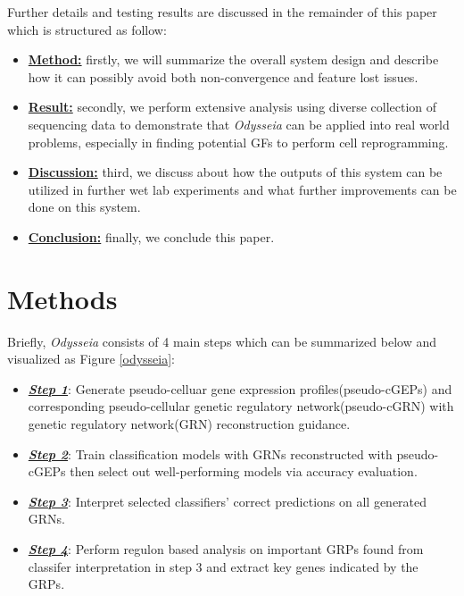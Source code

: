 \documentclass[fleqn,10pt]{wlscirep}
\begin{document}
Further details and testing results are discussed in the remainder of this paper which is structured as follow:
\begin{itemize}
\setlength\itemsep{0em}
\item{\hyperref[method]{\textbf{Method:}}}
    firstly, we will summarize the overall system design and describe how it can possibly avoid both non-convergence and feature lost issues.
\item {\hyperref[res]{\textbf{Result:}}}
    secondly, we perform extensive analysis using diverse collection of sequencing data to demonstrate that \emph{Odysseia} can be applied into real world problems, especially in finding potential GFs to perform cell reprogramming.
\item {\hyperref[disc]{\textbf{Discussion:}}}
    third, we discuss about how the outputs of this system can be utilized in further wet lab experiments and what further improvements can be done on this system.
\item {\hyperref[conc]{\textbf{Conclusion:}}}
    finally, we conclude this paper.
\end{itemize}

\section*{Methods}
\label{method}
Briefly, \emph{Odysseia} consists of 4 main steps which can be summarized below and visualized as Figure \ref{odysseia}:
\begin{itemize}
  \item \hyperref[step1]{\textbf{\emph{Step 1}}}: Generate pseudo-celluar gene expression profiles(pseudo-cGEPs) and corresponding pseudo-cellular genetic regulatory network(pseudo-cGRN) with genetic regulatory network(GRN) reconstruction guidance.
  \item \hyperref[step2]{\textbf{\emph{Step 2}}}: Train classification models with GRNs reconstructed with pseudo-cGEPs then select out well-performing models via accuracy evaluation.
  \item \hyperref[step3]{\textbf{\emph{Step 3}}}: Interpret selected classifiers' correct predictions on all generated GRNs.
  \item \hyperref[step4]{\textbf{\emph{Step 4}}}: Perform regulon based analysis on important GRPs found from classifer interpretation in step 3 and extract key genes indicated by the GRPs.
\end{itemize}
\end{document}
